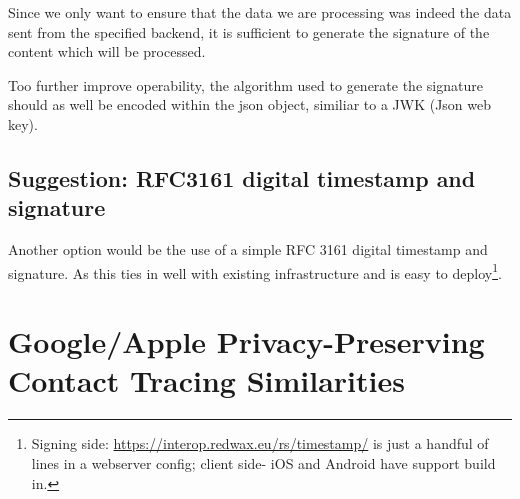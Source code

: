 Since we only want to ensure that the data we are processing was indeed the data sent from the specified backend, it is sufficient to generate the signature of the content which will be processed. 

Too further improve operability, the algorithm used to generate the signature should as well be encoded within the json object, similiar to a JWK (Json web key).

\subsection{Suggestion: RFC3161 digital timestamp and signature}

Another option would be the use of a simple RFC 3161 digital timestamp and signature. As this ties in well with existing infrastructure and is easy to deploy\footnote{Signing side: \url{https://interop.redwax.eu/rs/timestamp/} is just a handful of lines in a webserver config; client side- iOS and Android have support build in.}.


\section{Google/Apple Privacy-Preserving Contact Tracing Similarities}
